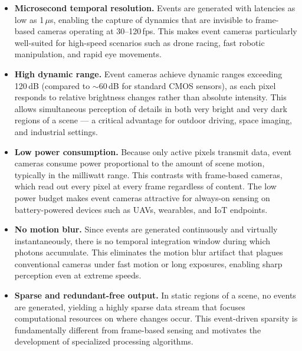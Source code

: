 \begin{itemize}[leftmargin=*]
    \item \textbf{Microsecond temporal resolution.} Events are generated with latencies as low as 1\,$\mu$s, enabling the capture of dynamics that are invisible to frame-based cameras operating at 30--120\,fps. This makes event cameras particularly well-suited for high-speed scenarios such as drone racing, fast robotic manipulation, and rapid eye movements.

    \item \textbf{High dynamic range.} Event cameras achieve dynamic ranges exceeding 120\,dB (compared to $\sim$60\,dB for standard CMOS sensors), as each pixel responds to relative brightness changes rather than absolute intensity. This allows simultaneous perception of details in both very bright and very dark regions of a scene --- a critical advantage for outdoor driving, space imaging, and industrial settings.

    \item \textbf{Low power consumption.} Because only active pixels transmit data, event cameras consume power proportional to the amount of scene motion, typically in the milliwatt range. This contrasts with frame-based cameras, which read out every pixel at every frame regardless of content. The low power budget makes event cameras attractive for always-on sensing on battery-powered devices such as UAVs, wearables, and IoT endpoints.

    \item \textbf{No motion blur.} Since events are generated continuously and virtually instantaneously, there is no temporal integration window during which photons accumulate. This eliminates the motion blur artifact that plagues conventional cameras under fast motion or long exposures, enabling sharp perception even at extreme speeds.

    \item \textbf{Sparse and redundant-free output.} In static regions of a scene, no events are generated, yielding a highly sparse data stream that focuses computational resources on where changes occur. This event-driven sparsity is fundamentally different from frame-based sensing and motivates the development of specialized processing algorithms.
\end{itemize}

